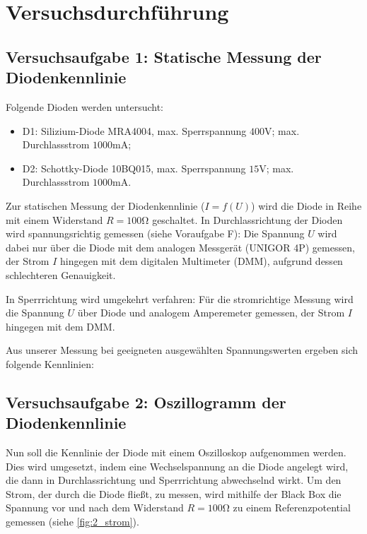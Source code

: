 \chapter{Versuchsdurchführung}

\section{Versuchsaufgabe 1: Statische Messung der Diodenkennlinie}

Folgende Dioden werden untersucht:

\begin{itemize}
    \item{D1:} Silizium-Diode MRA4004, max. Sperrspannung $400 \si{\volt}$; max. Durchlassstrom $1000 \si{\milli\ampere}$;
    \item{D2:} Schottky-Diode 10BQ015, max. Sperrspannung $15 \si{\volt}$; max. Durchlassstrom $1000 \si{\milli\ampere}$.
\end{itemize}

Zur statischen Messung der Diodenkennlinie ($I = f(U)$) wird die Diode in Reihe mit einem Widerstand $R = 100 \si{\ohm}$ geschaltet.
In Durchlassrichtung der Dioden wird spannungsrichtig gemessen (siehe Voraufgabe F):
Die Spannung $U$ wird dabei nur über die Diode mit dem analogen Messgerät (UNIGOR 4P) gemessen, 
der Strom $I$ hingegen mit dem digitalen Multimeter (DMM), aufgrund dessen schlechteren Genauigkeit.

In Sperrrichtung wird umgekehrt verfahren: Für die stromrichtige Messung wird die Spannung $U$ über Diode und analogem Amperemeter gemessen,
der Strom $I$ hingegen mit dem DMM.


Aus unserer Messung bei geeigneten ausgewählten Spannungswerten ergeben sich folgende Kennlinien:


\section{Versuchsaufgabe 2: Oszillogramm der Diodenkennlinie}

Nun soll die Kennlinie der Diode mit einem Oszilloskop aufgenommen werden.
Dies wird umgesetzt, indem eine Wechselspannung an die Diode angelegt wird, 
die dann in Durchlassrichtung und Sperrrichtung abwechselnd wirkt.
Um den Strom, der durch die Diode fließt, zu messen, wird mithilfe der Black Box die Spannung vor und nach dem Widerstand $R = 100 \si{\ohm}$
zu einem Referenzpotential gemessen (siehe \ref{fig:2_strom}).

